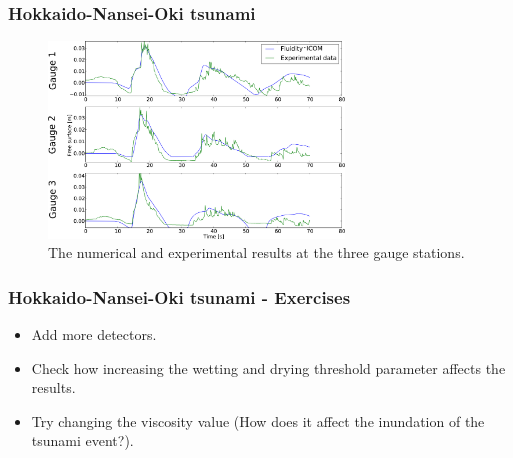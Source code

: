 \begin{frame}
    \frametitle{Hokkaido-Nansei-Oki tsunami}
\begin{figure}
\begin{center}
\includegraphics[width=0.7\textwidth]{hokkaido-nansei-oki_tsunami/MonaiValley_C_p1p1_nu0_01_kmkstab_drag0_002_butcircularoundisland0_2-crop-crop_final2.pdf}
\caption{The numerical and experimental results at the three gauge stations.}\label{fig:monai_results}
\end{center}
\end{figure}
\end{frame}


\begin{frame}
    \frametitle{Hokkaido-Nansei-Oki tsunami - Exercises}
  \begin{itemize}
    \item Add more detectors.\newline
    \item Check how increasing the wetting and drying threshold parameter affects the results.\newline
    \item Try changing the viscosity value (How does it affect the inundation of the tsunami event?).
  \end{itemize}
\end{frame}


